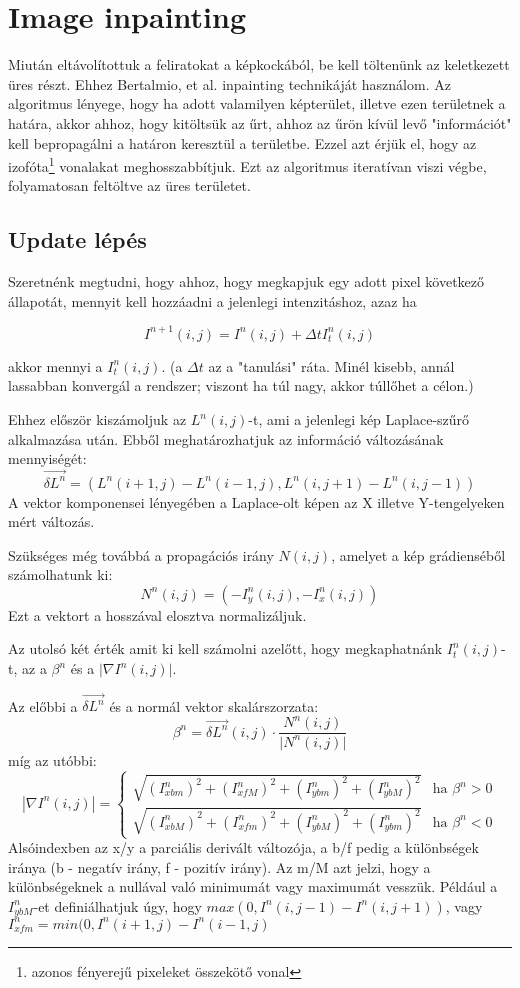 \documentclass[11pt]{article}
\begin{document}
\section{Image inpainting}

Miután eltávolítottuk a feliratokat a képkockából, be kell töltenünk az
keletkezett üres részt.
Ehhez Bertalmio, et al. inpainting technikáját \cite{bertalmio2000image}
használom.
Az algoritmus lényege, hogy ha adott valamilyen képterület, illetve ezen
területnek a határa, akkor ahhoz, hogy kitöltsük az űrt, ahhoz az űrön kívül
levő "információt" kell bepropagálni a határon keresztül a területbe.
Ezzel azt érjük el, hogy az izofóta\footnote{azonos fényerejű pixeleket
összekötő vonal} vonalakat meghosszabbítjuk.
Ezt az algoritmus iteratívan viszi végbe, folyamatosan feltöltve az üres
területet.

\subsection{Update lépés}
Szeretnénk megtudni, hogy ahhoz, hogy megkapjuk egy adott pixel következő állapotát, mennyit kell hozzáadni a jelenlegi intenzitáshoz, azaz ha

\[ I^{n+1}(i, j) = I^n(i, j) + \Delta t I^{n}_{t} (i,j) \]

akkor mennyi a $I^{n}_t (i,j)$.
(a $\Delta t$ az a "tanulási" ráta. Minél kisebb, annál lassabban konvergál a rendszer; viszont ha túl nagy, akkor túllőhet a célon.)

Ehhez először kiszámoljuk az $L^n (i, j)$-t, ami a jelenlegi kép Laplace-szűrő alkalmazása után.
Ebből meghatározhatjuk az információ változásának mennyiségét:
\[ \overrightarrow{\delta L^{n}} = (L^n(i+1,j) - L^n(i-1,j), L^n(i,j+1) - L^n(i,j-1)) \]
A vektor komponensei lényegében a Laplace-olt képen az X illetve Y-tengelyeken mért változás.

Szükséges még továbbá a propagációs irány $N(i, j)$, amelyet a kép grádienséből számolhatunk ki:
\[ N^{n}(i, j) = (-I^{n}_y(i, j), -I^{n}_x(i, j)) \]
Ezt a vektort a hosszával elosztva normalizáljuk.

Az utolsó két érték amit ki kell számolni azelőtt, hogy megkaphatnánk $I^{n}_t (i,j)$-t,
az a $ \beta^n $ és a $ \lvert \nabla I^n(i, j) \rvert $.

Az előbbi a $ \overrightarrow{ \delta L^n } $ és a normál vektor skalárszorzata:
\[ \beta^{n} = \overrightarrow{ \delta L^n }(i, j) \cdot \frac{ N^n (i, j) }{ \lvert N^n (i, j) \rvert } \]
míg az utóbbi:
\[ | \nabla I^n(i, j) | =
\begin{cases}
    \sqrt{(I^n_{x b m})^2 + (I^n_{x f M})^2 + (I^n_{y b m})^2 + (I^n_{y b M})^2} &\mbox{ha } \beta^n > 0 \\
    \sqrt{(I^n_{x b M})^2 + (I^n_{x f m})^2 + (I^n_{y b M})^2 + (I^n_{y b m})^2} &\mbox{ha } \beta^n < 0
\end{cases}
\]
Alsóindexben az x/y a parciális derivált változója, a b/f pedig a különbségek iránya (b - negatív irány, f - pozitív irány).
Az m/M azt jelzi, hogy a különbségeknek a nullával való minimumát vagy maximumát vesszük.
Például a $I^n_{y b M}$-et definiálhatjuk úgy, hogy $ max(0, I^n(i, j - 1) - I^n(i, j + 1)) $,
vagy $I^n_{x f m} = min(0, I^n(i + 1, j) - I^n(i - 1, j)$
\end{document}
